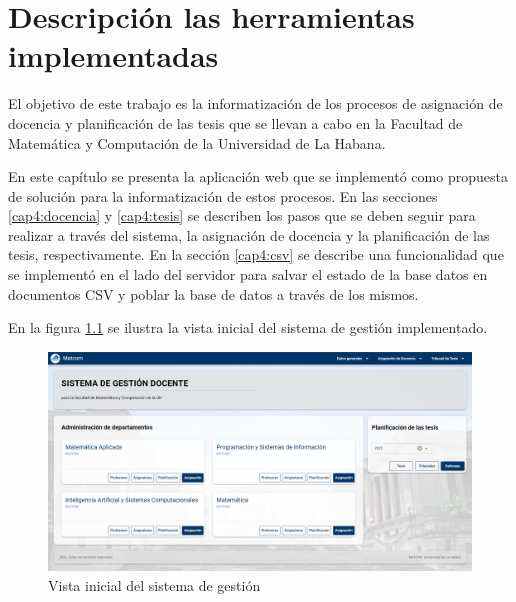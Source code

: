 \chapter{Descripción las herramientas implementadas}\label{chapter:implementation}
El objetivo de este trabajo es la informatización de los 
procesos de asignación de docencia y 
planificación de las tesis que se llevan a cabo 
en la Facultad de Matemática y Computación de la Universidad de La Habana. 

En este capítulo se presenta la aplicación web que se implementó 
como propuesta de solución para la informatización de estos procesos. 
En las secciones \ref{cap4:docencia} y \ref{cap4:tesis} se describen los pasos que se deben 
seguir para realizar a través del sistema, la asignación de docencia y la planificación de las tesis, respectivamente.
En la sección \ref{cap4:csv} se describe una funcionalidad que se implementó en el lado del servidor 
para salvar el estado de la base datos en documentos CSV y poblar la base de datos a través de los mismos.








En la figura \ref{img-home-page} se ilustra la vista inicial del sistema de 
gestión implementado.


\begin{figure}[H]
    \includegraphics[scale=0.3]{Graphics/Implementation/Home-page.png}
    \caption{Vista inicial del sistema de gestión}
    \label{img-home-page}
\end{figure}






